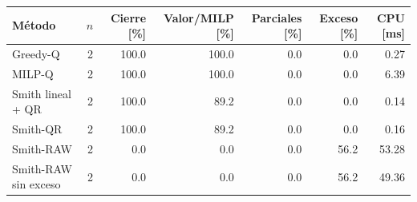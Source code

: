 \begin{tabular}{lrrrrrr}
\toprule
Método & $n$ & Cierre [\%] & Valor/MILP [\%] & Parciales [\%] & Exceso [\%] & CPU [ms] \\
\midrule
Greedy-Q & 2 & 100.0 & 100.0 & 0.0 & 0.0 & 0.27 \\
MILP-Q & 2 & 100.0 & 100.0 & 0.0 & 0.0 & 6.39 \\
Smith lineal + QR & 2 & 100.0 & 89.2 & 0.0 & 0.0 & 0.14 \\
Smith-QR & 2 & 100.0 & 89.2 & 0.0 & 0.0 & 0.16 \\
Smith-RAW & 2 & 0.0 & 0.0 & 0.0 & 56.2 & 53.28 \\
Smith-RAW sin exceso & 2 & 0.0 & 0.0 & 0.0 & 56.2 & 49.36 \\
\bottomrule
\end{tabular}
